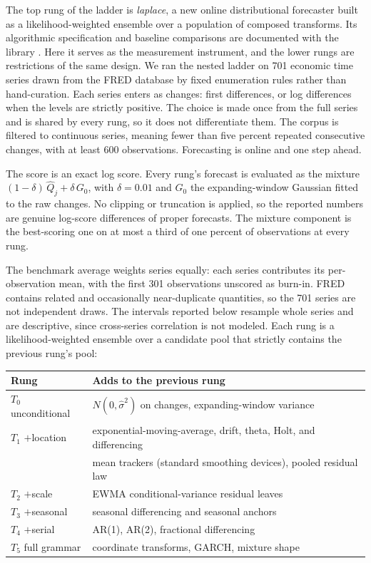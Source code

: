\documentclass[11pt]{article}
\theoremstyle{remark}
\begin{document}
The top rung of the ladder is \emph{laplace}, a new online distributional forecaster built
as a likelihood-weighted ensemble over a population of composed transforms. Its algorithmic
specification and baseline comparisons are documented with the library
\citep{cotton_skaters}. Here it serves as the measurement instrument, and the lower rungs
are restrictions of the same design. We ran the nested ladder on 701 economic time series
drawn from the FRED database by fixed enumeration rules rather than hand-curation. Each series enters as changes: first differences, or log differences when the levels are
strictly positive. The choice is made once from the full series and is shared by every rung,
so it does not differentiate them. The corpus is filtered to continuous series, meaning fewer than five percent
repeated consecutive changes, with at least 600 observations. Forecasting is online and one
step ahead.

The score is an exact log score. Every rung's forecast is evaluated as the mixture
$(1-\delta)\,\widehat Q_j+\delta\,G_0$, with $\delta=0.01$ and $G_0$ the expanding-window
Gaussian fitted to the raw changes. No clipping or truncation is applied, so the reported
numbers are genuine log-score differences of proper forecasts. The mixture component is the
best-scoring one on at most a third of one percent of observations at every rung.

The benchmark average weights series equally: each series contributes its per-observation
mean, with the first 301 observations unscored as burn-in. FRED contains related and occasionally near-duplicate
quantities, so the 701 series are not independent draws. The intervals reported below
resample whole series and are descriptive, since cross-series correlation is not modeled. Each rung is a likelihood-weighted ensemble over a candidate pool that strictly
contains the previous rung's pool:

\begin{center}
\small
\begin{tabular}{ll}
\toprule
Rung & Adds to the previous rung\\
\midrule
$T_0$ unconditional & $N(0,\hat\sigma^2)$ on changes, expanding-window variance\\
$T_1$ $+$location & exponential-moving-average, drift, theta, Holt, and differencing\\
 & \quad mean trackers (standard smoothing devices), pooled residual law\\
$T_2$ $+$scale & EWMA conditional-variance residual leaves\\
$T_3$ $+$seasonal & seasonal differencing and seasonal anchors\\
$T_4$ $+$serial & AR(1), AR(2), fractional differencing\\
$T_5$ full grammar & coordinate transforms, GARCH, mixture shape\\
\bottomrule
\end{tabular}
\end{center}
\end{document}
